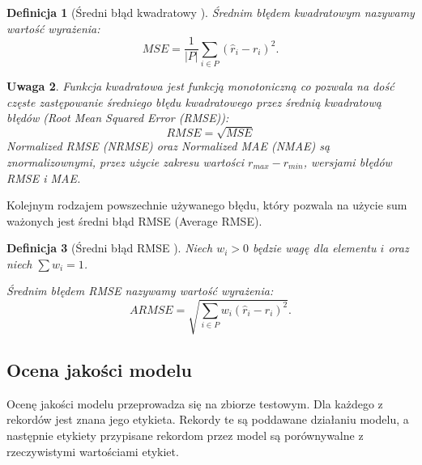 \documentclass[12pt,a4paper]{report}
\newtheorem{df}{Definicja}[chapter]
\newtheorem{uwaga}[df]{Uwaga}
\begin{document}
\begin{df}[Średni błąd kwadratowy  {\citep[Sec 4.1.1]{rsh}}]
Średnim błędem kwadratowym nazywamy wartość wyrażenia:
$$
MSE = \frac{1}{|\mathit{P}|}\sum_{i\in \mathit{P}}(\widehat{r}_i-r_i)^2.
$$
\end{df}
\begin{uwaga}{\citep[Sec 4.1.1]{rsh}}
Funkcja kwadratowa jest funkcją monotoniczną co pozwala na dość częste zastępowanie średniego błędu kwadratowego przez średnią kwadratową błędów (Root Mean Squared Error (RMSE)):
$$
RMSE = \sqrt{MSE}
$$
Normalized RMSE (NRMSE) oraz Normalized MAE (NMAE) są znormalizownymi, przez użycie zakresu wartości $r_{max} - r_{min}$, wersjami błędów RMSE i MAE.
\end{uwaga}
Kolejnym rodzajem powszechnie używanego błędu, który pozwala na użycie sum ważonych jest średni błąd RMSE (Average RMSE).

\begin{df}[Średni błąd RMSE {\citep[Sec 4.1.1]{rsh}}]
Niech $w_i>0$ będzie wagę dla elementu $i$ oraz niech $\sum w_i = 1$.

Średnim błędem RMSE nazywamy wartość wyrażenia:
$$
ARMSE = \sqrt{\sum_{i\in \mathit{P}}w_{i}(\widehat{r}_i-r_i)^2}.
$$
\end{df}
\subsection{Ocena jakości modelu}
Ocenę jakości modelu przeprowadza się na zbiorze testowym. Dla każdego z rekordów jest znana jego etykieta. Rekordy te są poddawane działaniu modelu, a następnie etykiety przypisane rekordom przez model są porównywalne z rzeczywistymi wartościami etykiet.
\end{document}
